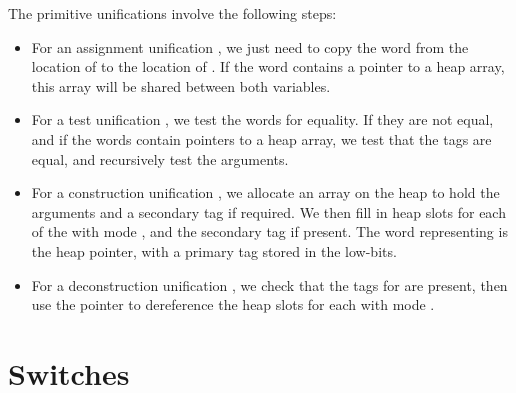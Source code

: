 The primitive unifications involve the following steps:
\begin{itemize}
\item
For an assignment unification ,
we just need to copy the word from
the location of  to the location of .
If the word contains a pointer to a heap array,
this array will be shared between both variables.
\item
For a test unification ,
we test the words for equality.
If they are not equal,
and if the words contain pointers to a heap array,
we test that the tags are equal,
and recursively test the arguments.
\item
For a construction unification ,
we allocate an array on the heap to hold the arguments
and a secondary tag if required.
We then fill in heap slots
for each of the  with mode ,
and the secondary tag if present.
The word representing  is the heap pointer,
with a primary tag stored in the low-bits.
\item
For a deconstruction unification ,
we check that the tags for  are present,
then use the pointer to dereference the heap slots
for each  with mode .
\end{itemize}


\section{Switches}
\label{sec:switches}


